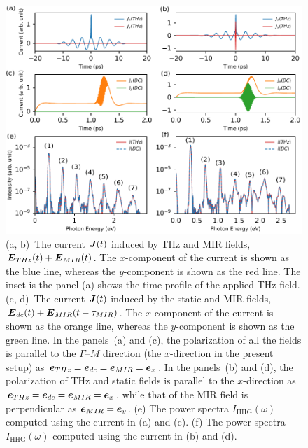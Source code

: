 \begin{figure}[ht]
\includegraphics[width=0.9\linewidth]{pic/fig1.pdf}
\caption{\label{fig:current}
(a, b)~The current $\boldsymbol{J} (t)$ induced by THz and MIR fields, $\boldsymbol E_{THz}(t)+\boldsymbol E_{MIR}(t)$. The $x$-component of the current is shown as the blue line, whereas the $y$-component is shown as the red line. The inset is the panel (a) shows the time profile of the applied THz field. (c, d)~The current $\boldsymbol{J}(t)$ induced by the static and MIR fields, $\boldsymbol E_{dc}(t)+\boldsymbol E_{MIR}(t-\tau_{MIR})$. The $x$ component of the current is shown as the orange line, whereas the $y$-component is shown as the green line. In the panels~(a) and (c), the polarization of all the fields is parallel to the $\Gamma$--$M$ direction (the $x$-direction in the present setup) as $\boldsymbol e_{THz}=\boldsymbol e_{dc}=\boldsymbol e_{MIR}=\boldsymbol e_x$. In the panels~(b) and (d), the polarization of THz and static fields is parallel to the $x$-direction as $\boldsymbol e_{THz}=\boldsymbol e_{dc}=\boldsymbol e_{MIR}=\boldsymbol e_x$, while that of the MIR field is perpendicular as $\boldsymbol e_{MIR}=\boldsymbol e_y$. (e) The power spectra $I_{\mathrm{HHG}}(\omega)$ computed using the current in (a) and (c). (f) The power spectra $I_{\mathrm{HHG}}(\omega)$ computed using the current in (b) and (d).
}
\end{figure}

